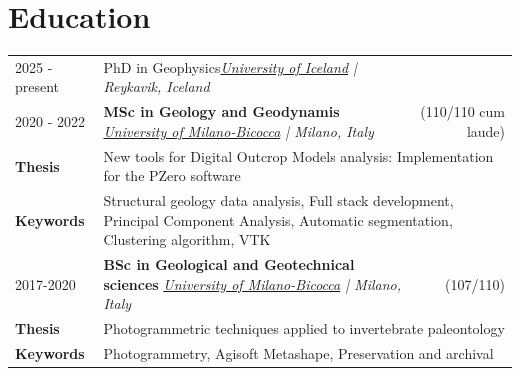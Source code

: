 \documentclass[a4paper,12pt]{article}
\begin{document}
\section{Education}
\begin{tabularx}{\linewidth}{@{}l X@{} @{}r}	
	2025 - present & PhD in Geophysics\newline \textit{\underline{University of Iceland} | Reykavik, Iceland}& \\
	
	2020 - 2022 & \textbf{MSc in Geology and Geodynamis} \newline \textit{\underline{University of Milano-Bicocca} | Milano, Italy} & (110/110 cum laude)\\
	\textbf{Thesis} & \multicolumn{2}{l}{New tools for Digital Outcrop Models analysis: Implementation for
		the PZero software} \\
	\textbf{Keywords} & \multicolumn{2}{p{0.8\textwidth}}{Structural geology data analysis, Full stack development, Principal Component Analysis, Automatic segmentation, Clustering algorithm, VTK}\\
	
	2017-2020 & \textbf{BSc in Geological and Geotechnical sciences} \newline \textit{\underline{University of Milano-Bicocca} | Milano, Italy} & (107/110)\\
	\textbf{Thesis} & \multicolumn{2}{l}{Photogrammetric techniques applied to invertebrate paleontology} \\
	\textbf{Keywords} & \multicolumn{2}{p{0.8\textwidth}}{Photogrammetry, Agisoft Metashape, Preservation and archival}\\
	
	
	
\end{tabularx}
\end{document}
